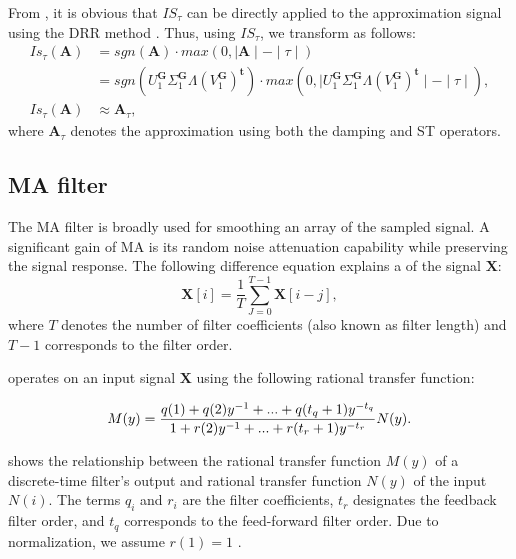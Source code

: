 From , it is obvious that $IS_\tau$ can be directly applied to the approximation signal  using the DRR method . Thus,  using $IS_\tau$, we transform  as follows:
\begin{align}
\nonumber
Is_\tau\left(\mathbf{A}\right)&=sgn(\mathbf{A})\cdot max(0,{\mid \mathbf{A} \mid - \mid \tau \mid})\\
\nonumber
&=sgn({U^{\mathbf{G}}_1{\Sigma^{\mathbf{G}}_1}\Lambda\left( V^{\mathbf{G}}_1\right)^{\mathbf{t}}})\cdot max(0,{\mid {U^{\mathbf{G}}_1{\Sigma^{\mathbf{G}}_1}\Lambda\left( V^{\mathbf{G}}_1\right)^{\mathbf{t}}} \mid - \mid \tau \mid}),\\
Is_\tau\left(\mathbf{A}\right)&\approx \mathbf{A}_\tau,
\end{align}
where $\mathbf{A}_\tau$ denotes the approximation  using both the damping and ST operators.

\subsection*{MA filter} 

The MA filter is broadly used for smoothing an array of the sampled signal. A significant gain of MA is its random noise attenuation capability while preserving the  signal response. The following difference equation explains a  of the signal $\mathbf{X}$:
\begin{equation}
\mathbf{X}[i] =\frac{1}{T}\sum_{J=0}^{T-1}\mathbf{X}\left[i-j\right],   
\end{equation}                                               
where $T$ denotes the number of filter coefficients (also known as filter length) and $T -1$ corresponds to the filter order.

 operates on an input signal $\mathbf{X}$ using the following rational transfer function:  

\begin{equation}
{M(y)=\frac{q(1)+q(2)y^{-1}+...+q(t_q + 1)y^{-t_q}}{1+r(2)y^{-1} +...+ r(t_r+1)y^{-t_r}}}{N(y)}\dlo{,}\wen{.}
\end{equation}

 shows the relationship between the rational transfer function $M(y)$ of a discrete-time filter's output  and rational transfer function $N(y)$ of the input $N(i)$. The terms ${q_i}$ and ${r_i}$ are the filter coefficients, $t_r$ designates the feedback filter order, and $t_q$ corresponds to the feed-forward filter order. Due to normalization, we assume $r(1) = 1$ \citep{schafer1989discrete}.

